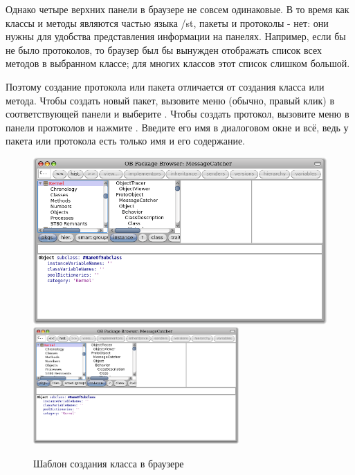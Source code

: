 \documentclass[a4paper,10pt,twoside]{book}
\begin{document}
Однако четыре верхних панели в браузере не совсем одинаковые. В то время как классы и методы являются частью языка /st, пакеты и протоколы - нет: они нужны для удобства представления информации на панелях. Например, если бы не было протоколов, то браузер был бы вынужден отображать список всех методов в выбранном классе; для многих классов этот список слишком большой.


Поэтому создание протокола или пакета отличается от создания класса или метода. Чтобы создать новый пакет, вызовите меню (обычно, правый клик) в соответствующей панели и выберите . Чтобы создать протокол, вызовите меню в панели протоколов и нажмите .
Введите его имя в диалоговом окне и всё, ведь у пакета или протокола есть только имя и его содержание.

\begin{figure}[htbp]
   \centering
   \ifluluelse
	   {\includegraphics[width=\textwidth]{SystemBrowserClassCreation}}
	   {\includegraphics[width=0.7\textwidth]{SystemBrowserClassCreation}}
   \caption{Шаблон создания класса в браузере
   }
\end{figure}
\end{document}
